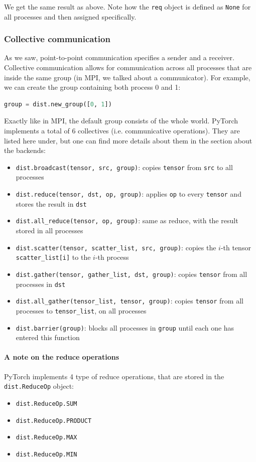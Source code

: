 \documentclass{article}
\begin{document}
We get the same result as above. Note how the \lstinline{req} object is defined as \lstinline{None} for all processes and then assigned specifically.

\subsubsection{Collective communication}
As we saw, point-to-point communication specifies a sender and a receiver. Collective communication allows for communication across all processes that are inside the same group (in MPI, we talked about a communicator). For example, we can create the group containing both process 0 and 1:
\begin{lstlisting}[language=Python]
group = dist.new_group([0, 1])
\end{lstlisting}
Exactly like in MPI, the default group consists of the whole world. PyTorch implements a total of 6 collectives (i.e. communicative operations). They are listed here under, but one can find more details about them in the section about the backends:
\begin{itemize}[noitemsep]
  \item \lstinline{dist.broadcast(tensor, src, group)}: copies \lstinline{tensor} from \lstinline{src} to all processes
  \item \lstinline{dist.reduce(tensor, dst, op, group)}: applies \lstinline{op} to every \lstinline{tensor} and stores the result in \lstinline{dst}
  \item \lstinline{dist.all_reduce(tensor, op, group)}: same as reduce, with the result stored in all processes
  \item \lstinline{dist.scatter(tensor, scatter_list, src, group)}: copies the \(i\)-th tensor \lstinline{scatter_list[i]} to the \(i\)-th process
  \item \lstinline{dist.gather(tensor, gather_list, dst, group)}: copies \lstinline{tensor} from all processes in \lstinline{dst}
  \item \lstinline{dist.all_gather(tensor_list, tensor, group)}: copies \lstinline{tensor} from all processes to \lstinline{tensor_list}, on all processes
  \item \lstinline{dist.barrier(group)}: blocks all processes in \lstinline{group} until each one has entered this function
\end{itemize}

\paragraph{A note on the reduce operations}
PyTorch implements 4 type of reduce operations, that are stored in the \lstinline{dist.ReduceOp} object:
\begin{itemize}[noitemsep]
  \item \lstinline{dist.ReduceOp.SUM}
  \item \lstinline{dist.ReduceOp.PRODUCT}
  \item \lstinline{dist.ReduceOp.MAX}
  \item \lstinline{dist.ReduceOp.MIN}
\end{itemize}
\end{document}
